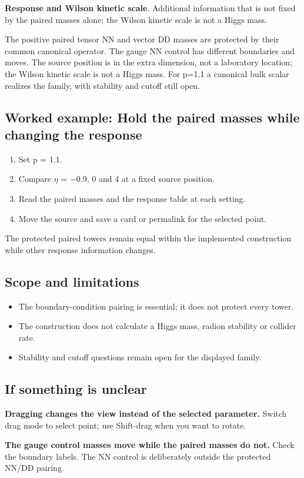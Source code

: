 \documentclass[11pt,a4paper]{article}
\begin{document}
\textbf{Response and Wilson kinetic scale}. Additional information that is not fixed by the paired masses alone; the Wilson kinetic scale is not a Higgs mass.

The positive paired tensor NN and vector DD masses are protected by their common canonical operator. The gauge NN control has different boundaries and moves. The source position is in the extra dimension, not a laboratory location; the Wilson kinetic scale is not a Higgs mass. For p=1.1 a canonical bulk scalar realizes the family, with stability and cutoff still open.
\subsection*{Worked example: Hold the paired masses while changing the response}
\begin{enumerate}
\item Set p = 1.1.
\item Compare \ensuremath{\eta} = \ensuremath{-}0.9, 0 and 4 at a fixed source position.
\item Read the paired masses and the response table at each setting.
\item Move the source and save a card or permalink for the selected point.
\end{enumerate}
The protected paired towers remain equal within the implemented construction while other response information changes.
\subsection*{Scope and limitations}
\begin{itemize}
\item The boundary-condition pairing is essential; it does not protect every tower.
\item The construction does not calculate a Higgs mass, radion stability or collider rate.
\item Stability and cutoff questions remain open for the displayed family.
\end{itemize}
\subsection*{If something is unclear}
\textbf{Dragging changes the view instead of the selected parameter.} Switch drag mode to select point; use Shift-drag when you want to rotate.

\textbf{The gauge control masses move while the paired masses do not.} Check the boundary labels. The NN control is deliberately outside the protected NN/DD pairing.
\end{document}
